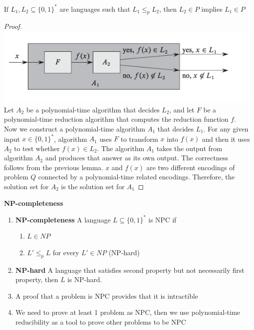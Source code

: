 \documentclass[11pt]{article}
\begin{document}
\begin{lemma*}
    If $L_1, L_2 \subseteq \{0,1\}^*$ are languages such that $L_1 \leq_p L_2$, then $L_2 \in P$ implies $L_1 \in P$
    \begin{proof}
        \includegraphics[width=\textwidth]{reducibility_lemma.png}
        Let $A_2$ be a polynomial-time algorithm that decides $L_2$, and let $F$ be a polynomial-time reduction algorithm that computes the reduction function $f$. Now we construct a polynomial-time algorithm $A_1$ that decides $L_1$. For any given input $x\in\{0,1\}^*$, algorithm $A_1$ uses $F$ to transform $x$ into $f(x)$ and then it uses $A_2$ to test whether $f(x)\in L_2$. The algorithm $A_1$ takes the output from algorithm $A_2$ and produces that answer as its own output. The correctness follows from the previous lemma. $x$ and $f(x)$ are two different encodings of problem $Q$ connected by a polynomial-time related encodings. Therefore, the solution set for $A_2$ is the solution set for $A_1$
    \end{proof}
\end{lemma*}

\begin{defn*}
    \textbf{NP-completeness}
    \begin{enumerate}
        \item \textbf{NP-completeness} A language $L\subseteq \{0,1\}^*$ is NPC if
        \begin{enumerate}
            \item $L\in NP$ 
            \item $L' \leq_p L$ for every $L' \in NP$ (NP-hard)
        \end{enumerate}
        \item \textbf{NP-hard} A language that satisfies second property but not necessarily first property, then $L$ is NP-hard.
        \item A proof that a problem is NPC provides that it is intractible
        \item We need to prove at least 1 problem as NPC, then we use polynomial-time reducibility as a tool to prove other problems to be NPC
    \end{enumerate}
\end{defn*}
\end{document}

